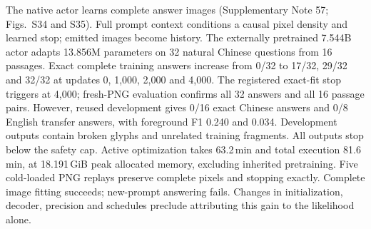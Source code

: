 The native actor learns complete answer images
(Supplementary Note 57; Figs.~S34 and S35). Full prompt context conditions a
causal pixel density and learned stop; emitted images become history.
The externally pretrained 7.544B actor adapts 13.856M parameters on 32 natural
Chinese questions from 16 passages. Exact complete training answers increase
from 0/32 to 17/32, 29/32 and 32/32 at updates 0, 1,000, 2,000 and 4,000.
The registered exact-fit stop triggers at 4,000; fresh-PNG evaluation confirms
all 32 answers and all 16 passage pairs. However, reused development gives
0/16 exact Chinese answers and 0/8 English transfer answers, with foreground
F1 0.240 and 0.034. Development outputs contain broken glyphs and unrelated
training fragments. All outputs stop below the
safety cap. Active optimization takes 63.2\,min and total execution 81.6\,min,
at 18.191\,GiB peak allocated memory, excluding inherited pretraining.
Five cold-loaded PNG replays preserve complete pixels and stopping exactly.
Complete image fitting succeeds; new-prompt answering fails.
Changes in initialization, decoder, precision and schedules preclude attributing
this gain to the likelihood alone.

